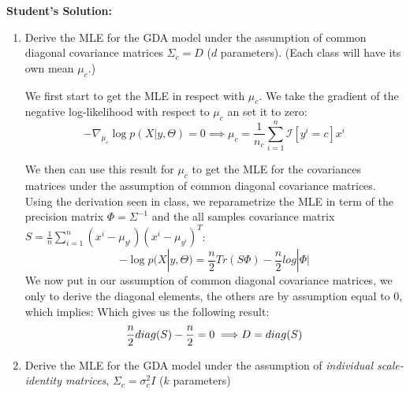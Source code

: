 \documentclass{article}
\begin{document}
\textbf{Student's Solution:}
\begin{enumerate}
\item Derive the MLE for the GDA model under the assumption of common diagonal covariance matrices $\Sigma_c = D$ ($d$ parameters). (Each class will have its own mean $\mu_c$.)
  
 We first start to get the MLE in respect with $\mu_c$. We take the gradient of the negative log-likelihood with respect to $\mu_c$ an set it to zero:
 \[ - \nabla_{\mu_c} \log p(X|y,\Theta)  = 0 \implies \mu_c= \frac{1}{n_c}\sum_{i=1}^n \mathcal{I}[y^i=c] x^i \]

 We then can use this result for $\mu_c$ to get the MLE for the covariances matrices under the assumption of common diagonal covariance matrices. Using the derivation seen in class, we reparametrize the MLE in term of the precision matrix $\Phi = \Sigma^{-1}$ and the all samples covariance matrix $S = \frac{1}{n} \sum_{i=1}^n (x^i - \mu_{y^i})(x^i - \mu_{y^i})^T$:
 \[- \log p(X|y,\Theta)  = \frac{n}{2} Tr(S \Phi) - \frac{n}{2} log|\Phi| \]
 We now put in our assumption of common diagonal covariance matrices, we only to derive the diagonal elements, the others are by assumption equal to 0, which implies:
 Which gives us the following result:
 \[
 \frac{n}{2} diag(S) - \frac{n}{2} = 0 \implies \\
 D = diag(S)
 \]
\item Derive the MLE for the GDA model under the assumption of \emph{individual scale-identity matrices}, $\Sigma_c = \sigma_c^2 I$ ($k$ parameters)
 

\end{enumerate}
\end{document}
